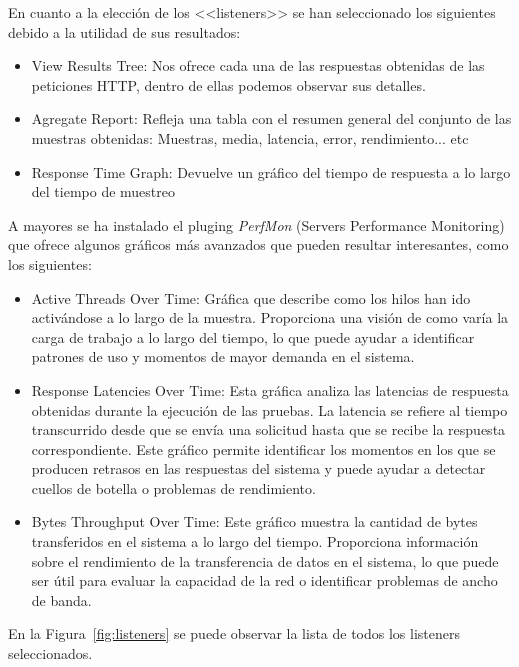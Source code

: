 En cuanto a la elección de los <<listeners>> se han seleccionado los siguientes debido a la utilidad de sus resultados:
\begin{itemize}
    \item View Results Tree: Nos ofrece cada una de las respuestas obtenidas de las peticiones HTTP, dentro de ellas podemos observar sus detalles.
    \item Agregate Report: Refleja una tabla con el resumen general del conjunto de las muestras obtenidas: Muestras, media, latencia, error, rendimiento... etc
    \item Response Time Graph: Devuelve un gráfico del tiempo de respuesta a lo largo del tiempo de muestreo
\end{itemize}
A mayores se ha instalado el pluging \textit{PerfMon} (Servers Performance Monitoring) que ofrece algunos gráficos más avanzados que pueden resultar interesantes, como los siguientes:

\begin{itemize}
    \item Active Threads Over Time: Gráfica que describe como los hilos han ido activándose a lo largo de la muestra. Proporciona una visión de como varía la carga de trabajo a lo largo del tiempo, lo que puede ayudar a identificar patrones de uso y momentos de mayor demanda en el sistema.
    \item Response Latencies Over Time: Esta gráfica analiza las latencias de respuesta obtenidas durante la ejecución de las pruebas. La latencia se refiere al tiempo transcurrido desde que se envía una solicitud hasta que se recibe la respuesta correspondiente. Este gráfico permite identificar los momentos en los que se producen retrasos en las respuestas del sistema y puede ayudar a detectar cuellos de botella o problemas de rendimiento.
    \item Bytes Throughput Over Time: Este gráfico muestra la cantidad de bytes transferidos en el sistema a lo largo del tiempo. Proporciona información sobre el rendimiento de la transferencia de datos en el sistema, lo que puede ser útil para evaluar la capacidad de la red o identificar problemas de ancho de banda.    
\end{itemize}

En la Figura~\ref{fig:listeners} se puede observar la lista de todos los listeners seleccionados.

